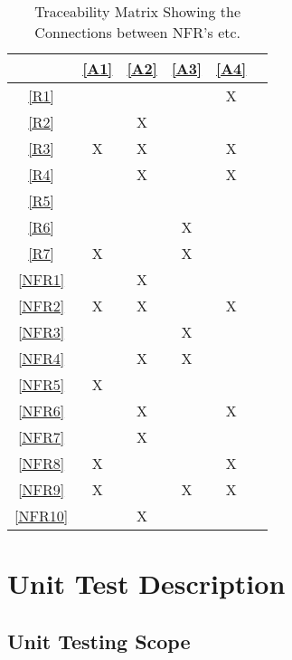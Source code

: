 \documentclass[12pt, titlepage]{article}
\begin{document}
\begin{enumerate}
\noindent
\begin{table}[h!]
\centering
\begin{tabular}{|c|c|c|c|c|c}
\hline
	& \ref{A1}& \ref{A2}& \ref{A3}& \ref{A4} \\
\hline          %
\ref{R1}       &   &   &   & X  \\ \hline
\ref{R2}       &   & X&   &    \\ \hline
\ref{R3}       & X& X&   & X  \\ \hline
\ref{R4}       &   & X&   & X  \\ \hline
\ref{R5}       &   &   &   &    \\ \hline
\ref{R6}       &   &   & X&    \\ \hline
\ref{R7}       & X&   & X&     \\ \hline
\ref{NFR1} &   & X&   &    \\ \hline
\ref{NFR2} & X& X&   & X \\ \hline
\ref{NFR3} &   &   & X&     \\ \hline
\ref{NFR4} &   & X& X&     \\ \hline
\ref{NFR5} &   X&   &   &      \\ \hline
\ref{NFR6} &   &  X &   &X     \\ \hline
\ref{NFR7} &   &  X &   &     \\ \hline
\ref{NFR8} &  X &   &   &X     \\ \hline
\ref{NFR9} & X  &   &X  &X      \\ \hline
\ref{NFR10}&  & X  &   &      \\
\hline
\end{tabular}
\caption{Traceability Matrix Showing the Connections between NFR's etc.}
\label{Table:A_trace}
\end{table}

\newpage
\section{Unit Test Description}


\subsection{Unit Testing Scope}


\end{enumerate}
\end{document}
